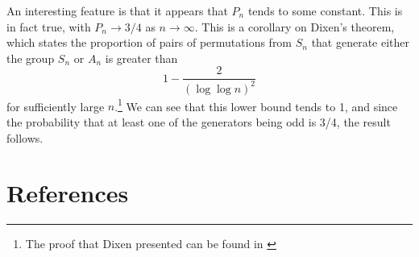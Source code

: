 \documentclass[10pt,a4paper,notitlepage]{article}
\begin{document}
An interesting feature is that it appears that $P_{n}$ tends to some constant. This is in fact true, with $P_{n}\rightarrow 3/4$ as $n\rightarrow \infty$. This is a corollary on Dixen's theorem, which states the proportion of pairs of permutations from $S_{n}$ that generate either the group $S_{n}$ or $A_{n}$ is greater than
\begin{equation}
1-\frac{2}{\left(\log\log n\right)^{2}}
\end{equation}
for sufficiently large $n$.\footnote{The proof that Dixen presented can be found in \cite{DIXEN}} We can see that this lower bound tends to 1, and since the probability that at least one of the generators being odd is 3/4, the result follows.

\section*{\centering References}\label{References}
\printbibliography[heading=none]

\pagebreak
\end{document}
